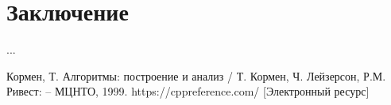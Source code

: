 \documentclass[12pt, a4paper]{report}
\begin{document}
	\newpage

	\chapter*{Заключение}
	
	...
	
	\newpage
	
	\begin{thebibliography}{}
	 Кормен, Т. Алгоритмы: построение и анализ / Т. Кормен, Ч. Лейзерсон, Р.М. Ривест: – МЦНТО, 1999.
	 https://cppreference.com/ [Электронный ресурс]
	\end{thebibliography}
\end{document}
